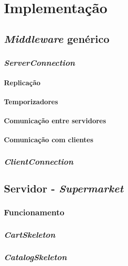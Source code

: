 \documentclass[a4paper]{report}
\begin{document}
\chapter{Implementação} \label{ch:Implementation}
\large{
	\section{\textit{Middleware} genérico} \label{sec:Middleware}
		\subsection{\textit{ServerConnection}} \label{subsec:ServerConnection}
			\subsubsection{Replicação} \label{sssec:Replication}
			\subsubsection{Temporizadores} \label{sssec:Timers}
			\subsubsection{Comunicação entre servidores} \label{sssec:ServerCommunication}
			\subsubsection{Comunicação com clientes} \label{sssec:ClientCommunication}
		\subsection{\textit{ClientConnection}} \label{subsec:ClientConnection}
	
	\section{Servidor - \textit{Supermarket}} \label{sec:Server}
		\subsection{Funcionamento} \label{subsec:ServerWorking}
		\subsection{\textit{CartSkeleton}} \label{subsec:ServerCartSkeleton}
		\subsection{\textit{CatalogSkeleton}} \label{subsec:ServerCatalogSkeleton}
	
}
\end{document}
